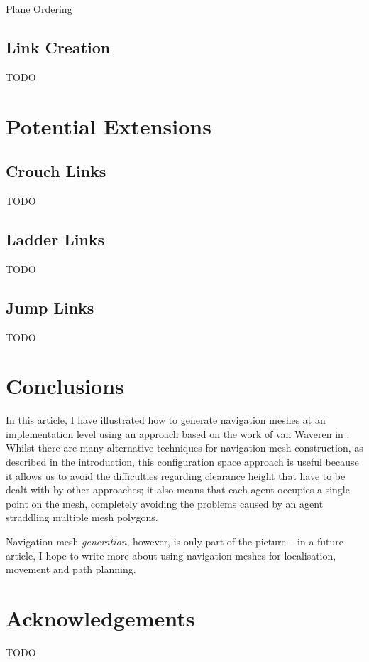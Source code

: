 \documentclass[10pt,twocolumn]{article}
\begin{document}
\begin{stulisting}[t]
\caption{Plane Ordering}
\label{code:plane-ordering}

\end{stulisting}

\subsection{Link Creation}

TODO

\section{Potential Extensions}

\subsection{Crouch Links}

TODO

\subsection{Ladder Links}

TODO

\subsection{Jump Links}

TODO

\section{Conclusions}

In this article, I have illustrated how to generate navigation meshes at an implementation level using an approach based on the work of van Waveren in \cite{vanwaveren01}. Whilst there are many alternative techniques for navigation mesh construction, as described in the introduction, this configuration space approach is useful because it allows us to avoid the difficulties regarding clearance height that have to be dealt with by other approaches; it also means that each agent occupies a single point on the mesh, completely avoiding the problems caused by an agent straddling multiple mesh polygons.

Navigation mesh \emph{generation}, however, is only part of the picture -- in a future article, I hope to write more about using navigation meshes for localisation, movement and path planning.

\section{Acknowledgements}

TODO




\end{document}
